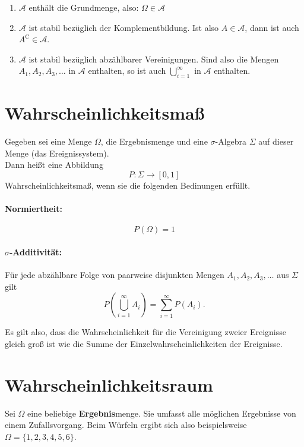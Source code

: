 \documentclass[paper=a4,10pt]{scrartcl}
\begin{document}
\begin{enumerate}
	\item $\mathcal{A}$ enthält die Grundmenge, also: $\Omega \in \mathcal{A}$
	\item $\mathcal{A}$ ist stabil bezüglich der Komplementbildung. Ist also $A \in \mathcal{A}$, dann ist auch $A^{\mathrm{C}} \in \mathcal{A}$.
	\item $\mathcal{A}$ ist stabil bezüglich abzählbarer Vereinigungen. Sind also die Mengen $A_1, A_2, A_3, \dots$ in $\mathcal{A}$ enthalten, so ist auch $\bigcup_{i=1}^\infty$ in $\mathcal{A}$ enthalten.
\end{enumerate}

\section{Wahrscheinlichkeitsmaß}
Gegeben sei eine Menge $\Omega$, die Ergebnismenge und eine $\sigma$-Algebra $\Sigma$ auf dieser Menge (das Ereignissystem).\\

\noindent
Dann heißt eine Abbildung
\begin{equation}
P: \Sigma \rightarrow [0,1]
\end{equation}
Wahrscheinlichkeitsmaß, wenn sie die folgenden Bedinungen erfüllt.

\paragraph{Normiertheit:}
\begin{equation}
P(\Omega) = 1
\end{equation}

\paragraph{$\sigma$-Additivität:}
Für jede abzählbare Folge von paarweise disjunkten Mengen $A_1, A_2, A_3, \dots$ aus $\Sigma$ gilt
\begin{equation}
P\left( \bigcup^{\infty}_{i=1}A_i\right) = \sum_{i=1}^{\infty} P(A_i). 
\end{equation} 

\noindent
Es gilt also, dass die Wahrscheinlichkeit für die Vereinigung zweier Ereignisse gleich groß ist wie die Summe der Einzelwahrscheinlichkeiten der Ereignisse.

\section{Wahrscheinlichkeitsraum}
Sei $\Omega$ eine beliebige \textbf{Ergebnis}menge. Sie umfasst alle möglichen Ergebnisse von einem Zufallsvorgang. Beim Würfeln ergibt sich also beispielsweise $\Omega = \{ 1,2,3,4,5,6\}$.
\end{document}

